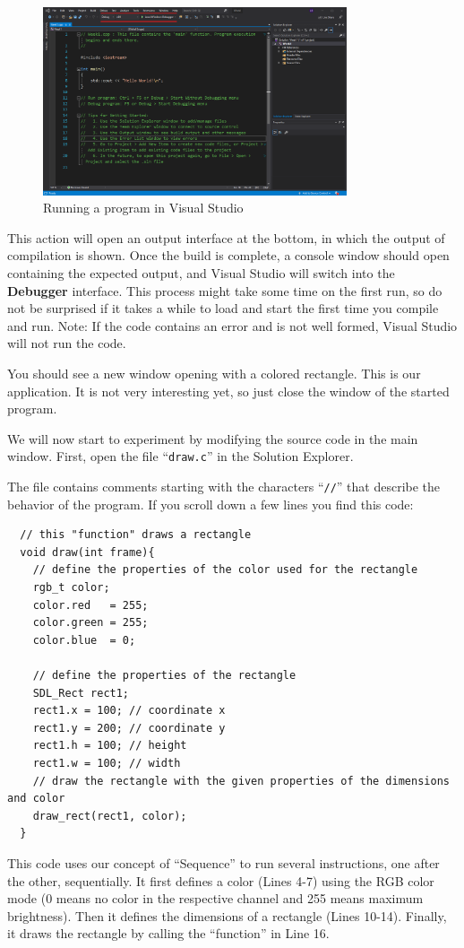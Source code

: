 \begin{steps}
  \begin{figure}[H]
      \centering
      \includegraphics[width=0.8\textwidth]{img/new-hello-world.png}
      \caption{\label{helloworld} Running a program in Visual Studio}
  \end{figure}

  This action will open an output interface at the bottom, in which the output of compilation is shown.
  Once the build is complete, a console window should open containing the expected output, and Visual Studio will switch into the \textbf{Debugger} interface.
  This process might take some time on the first run, so do not be surprised if it takes a while to load and start the first time you compile and run.
  Note: If the code contains an error and is not well formed, Visual Studio will not run the code.

  \item You should see a new window opening with a colored rectangle. This is our application.
  It is not very interesting yet, so just close the window of the started program.
  \item We will now start to experiment by modifying the source code in the main window. First, open the file “\texttt{draw.c}” in the Solution Explorer.
  \item The file contains comments starting with the characters “\texttt{//}” that describe the behavior of the program. If you scroll down a few lines you find this code:
  \begin{lstlisting}
  // this "function" draws a rectangle
  void draw(int frame){
    // define the properties of the color used for the rectangle
    rgb_t color;
    color.red   = 255;
    color.green = 255;
    color.blue  = 0;

    // define the properties of the rectangle
    SDL_Rect rect1;
    rect1.x = 100; // coordinate x
    rect1.y = 200; // coordinate y
    rect1.h = 100; // height
    rect1.w = 100; // width
    // draw the rectangle with the given properties of the dimensions and color
    draw_rect(rect1, color);
  }
  \end{lstlisting}
  This code uses our concept of “Sequence” to run several instructions, one after the other, sequentially.
  It first defines a color (Lines 4-7) using the RGB color mode (0 means no color in the respective channel and 255 means maximum brightness).
  Then it defines the dimensions of a rectangle (Lines 10-14).
  Finally, it draws the rectangle by calling the “function”  in Line 16.


\end{steps}
